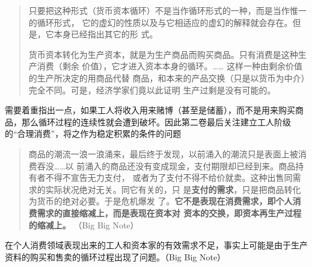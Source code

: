 \begin{quotation}

  只要把这种形式（货币资本循环）不是当作循环形式的一种，而是当作惟一的循环形式，
  它的虚幻的性质以及与它相适应的虚幻的解释就会存在。但是，它本身已经指出其它的形
  式。 

  货币资本转化为生产资本，就是为生产商品而购买商品。只有消费是这种生产消费（剩余
  价值），它才进入资本本身的循环。…… 这样一种由剩余价值的生产所决定的用商品代替
  商品，和本来的产品交换（只是以货币为中介）完全不同。可是，经济学家们竟以此证明
  生产过剩是没有可能的。 

\end{quotation}

需要着重指出一点，如果工人将收入用来赌博（甚至是储蓄），而不是用来购买商品，那么循环过程的连续性就会遭到破坏。因此第二卷最后关注建立工人阶级的“合理消费”，将之作为稳定积累的条件的问题

\begin{quotation}
  商品的潮流一浪一浪涌来，最后终于发现，以前涌入的潮流只是表面上被消费吞没……以
  前涌入的商品还没有变成现金，支付期限却已经到来。商品持有者不得不宣告无力支付，
  或者为了支付不得不给价就卖。这种出售同需求的实际状况绝对无关。同它有关的，只
  是\textbf{支付的需求}，只是把商品转化为货币的绝对必要。于是危机爆发
  了。\textbf{它不是表现在消费需求，即个人消费需求的直接缩减上，而是表现在资本对
    资本的交换，即资本再生产过程的缩减上。} （Big Big Note）

\end{quotation}

在个人消费领域表现出来的工人和资本家的有效需求不足，事实上可能是由于生产资料的购买和售卖的循环过程出现了问题。（Big Big Note）

